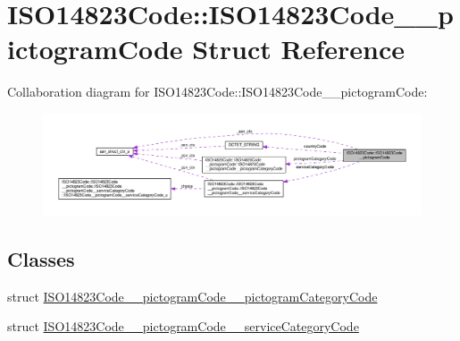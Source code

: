 \hypertarget{structISO14823Code_1_1ISO14823Code____pictogramCode}{}\section{I\+S\+O14823\+Code\+:\+:I\+S\+O14823\+Code\+\_\+\+\_\+pictogram\+Code Struct Reference}
\label{structISO14823Code_1_1ISO14823Code____pictogramCode}


Collaboration diagram for I\+S\+O14823\+Code\+:\+:I\+S\+O14823\+Code\+\_\+\+\_\+pictogram\+Code\+:\nopagebreak
\begin{figure}[H]
\begin{center}
\leavevmode
\includegraphics[width=350pt]{structISO14823Code_1_1ISO14823Code____pictogramCode__coll__graph}
\end{center}
\end{figure}
\subsection*{Classes}
\begin{DoxyCompactItemize}
\item 
struct \hyperlink{structISO14823Code_1_1ISO14823Code____pictogramCode_1_1ISO14823Code____pictogramCode____pictogramCategoryCode}{I\+S\+O14823\+Code\+\_\+\+\_\+pictogram\+Code\+\_\+\+\_\+pictogram\+Category\+Code}
\item 
struct \hyperlink{structISO14823Code_1_1ISO14823Code____pictogramCode_1_1ISO14823Code____pictogramCode____serviceCategoryCode}{I\+S\+O14823\+Code\+\_\+\+\_\+pictogram\+Code\+\_\+\+\_\+service\+Category\+Code}
\end{DoxyCompactItemize}

